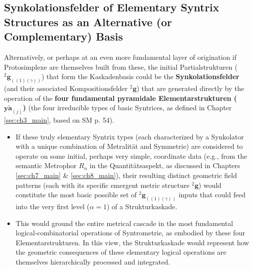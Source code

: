 \documentclass[
    12pt,              %
    a4paper,           %
    headings=normal,   %
    twoside=true,      %
    BCOR=8mm,          %
]{scrbook}
\newcommand{\elementarstruktur}{\bm{y\widetilde{a}}_{(j)}}
\newcommand{\semantischermetrophor}{R_n}
\newcommand{\kompositionsfeld}{{}^2\mathbf{g}}
\newcommand{\partialstruktur}[1]{{}^2\mathbf{g}_{(#1)}}
\newcommand{\kaskadenstufe}{\alpha}
\begin{document}
\subsection{Synkolationsfelder of Elementary Syntrix Structures as an Alternative (or Complementary) Basis}
\label{sec:ch9_2_2_elementary_syntrix_basis}
Alternatively, or perhaps at an even more fundamental layer of origination if Protosimplexe are themselves built from these, the initial Partialstrukturen (\(\partialstruktur{(1)(\gamma)}\)) that form the Kaskadenbasis could be the \textbf{Synkolationsfelder} (and their associated Kompositionsfelder \(\kompositionsfeld\)) that are generated directly by the operation of the \textbf{four fundamental pyramidale Elementarstrukturen (\(\elementarstruktur\))} (the four irreducible types of basic Syntrices, as defined in Chapter \ref{sec:ch3_main}, based on SM p. 54).
\begin{itemize}
    \item   If these truly elementary Syntrix types (each characterized by a Synkolator with a unique combination of Metralität and Symmetrie) are considered to operate on some initial, perhaps very simple, coordinate data (e.g., from the semantic Metrophor \(\semantischermetrophor\) in the Quantitätsaspekt, as discussed in Chapters \ref{sec:ch7_main} \& \ref{sec:ch8_main}), their resulting distinct geometric field patterns (each with its specific emergent metric structure \(\kompositionsfeld\)) would constitute the most basic possible set of \(\partialstruktur{(1)(\gamma)}\) inputs that could feed into the very first level (\(\kaskadenstufe=1\)) of a Strukturkaskade.
    \item   This would ground the entire metrical cascade in the most fundamental logical-combinatorial operations of Syntrometrie, as embodied by these four Elementarstrukturen. In this view, the Strukturkaskade would represent how the geometric consequences of these elementary logical operations are themselves hierarchically processed and integrated.
\end{itemize}
\end{document}
